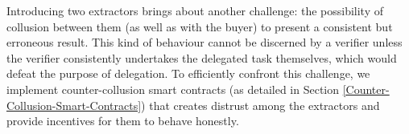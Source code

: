 Introducing two extractors brings about another challenge: the possibility of collusion between them (as well as with the buyer) to present a consistent but erroneous result. This kind of behaviour cannot be discerned by a verifier unless the verifier consistently undertakes the delegated task themselves, which would defeat the purpose of delegation. To efficiently confront this challenge, we implement counter-collusion smart contracts (as detailed in Section \ref{Counter-Collusion-Smart-Contracts}) that creates distrust among the extractors and provide incentives for them to behave honestly. 













 
